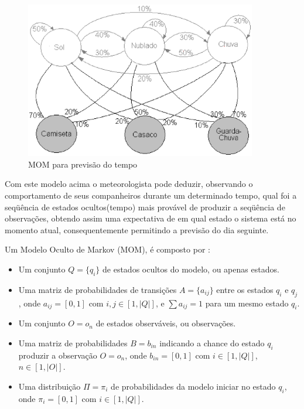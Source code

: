 \begin{figure}[H]
\includegraphics[width=0.9\textwidth]{graficos/markov_2.eps}
\caption{MOM para previsão do tempo}
\label{figHmm2}
\end{figure}

Com este modelo acima o meteorologista pode deduzir, observando o comportamento de seus companheiros durante um determinado tempo, qual foi a seqüência de estados ocultos(tempo) mais provável de produzir a seqüência de observações, obtendo assim uma expectativa de em qual estado o sistema está no momento atual, consequentemente permitindo a previsão do dia seguinte. 

Um Modelo Oculto de Markov (MOM), é composto por \cite{AplicHmmWaghabi}:

\begin{itemize}
\item Um conjunto $Q={\{q_{i}\}}$ de estados ocultos do modelo, ou apenas estados.
\item Uma matriz de probabilidades de transições $A=\{a_{ij}\}$ entre os estados ${q_{i}}$ e ${q_{j}}$, onde ${a_{ij}} = [0, 1]$ com $i, j \in [1, |Q|]$, e $\sum a_{ij} = 1$ para um mesmo estado ${q_{i}}$. 
\item Um conjunto $O={o_{n}}$ de estados observáveis, ou observações.
\item Uma matriz de probabilidades $B={b_{in}}$ indicando a chance do estado ${q_{i}}$ produzir a observação $O={o_{n}}$, onde ${b_{in}} = [0, 1]$ com $i \in [1, |Q|]$, $n \in [1, |O|]$.
\item Uma distribuição $\Pi =  {{\pi_{i}}}$ de probabilidades da modelo iniciar no estado ${q_{i}}$, onde ${\pi_{i}} = [0, 1]$ com $i \in [1, |Q|]$.
\end{itemize}


